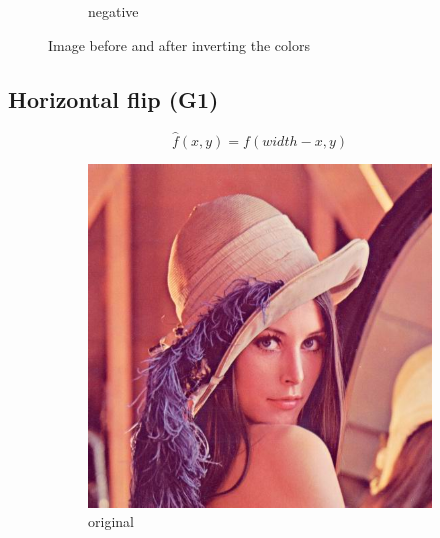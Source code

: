 \documentclass[12pt]{article}
\newcommand{\subfiguresize}{.3\textwidth}
\begin{document}
\begin{figure}[H]
\begin{subfigure}[t]{\subfiguresize}
        \caption{negative}
    \end{subfigure}
    \caption{Image before and after inverting the colors}
\end{figure}

\subsection*{Horizontal flip (G1)}

\begin{equation}
    \hat{f}(x,y) = f(width - x, y)
\end{equation}

\begin{figure}[H]\centering
    \begin{subfigure}[t]{\subfiguresize}\centering
        \includegraphics[width=\textwidth]{lenac.png}
        \caption{original}
    \end{subfigure}
    \hspace{.05\textwidth}
    \begin{subfigure}[t]{\subfiguresize}\centering

\end{subfigure}
\end{figure}
\end{document}
